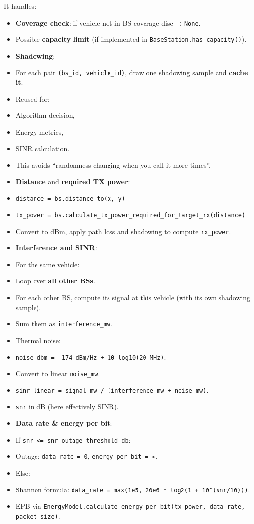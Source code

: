 \documentclass[conference]{IEEEtran}
\begin{document}
It handles:
\begin{itemize}
\item \textbf{Coverage check}: if vehicle not in BS coverage disc → \texttt{None}.
\item Possible \textbf{capacity limit} (if implemented in \texttt{BaseStation.has\_capacity()}).
\item \textbf{Shadowing}:
\item For each pair \texttt{(bs\_id, vehicle\_id)}, draw one shadowing sample and \textbf{cache it}.
\item Reused for:
\item Algorithm decision,
\item Energy metrics,
\item SINR calculation.
\item This avoids “randomness changing when you call it more times”.
\item \textbf{Distance} and \textbf{required TX power}:
\item \texttt{distance = bs.distance\_to(x, y)}
\item \texttt{tx\_power = bs.calculate\_tx\_power\_required\_for\_target\_rx(distance)}
\item Convert to dBm, apply path loss and shadowing to compute \texttt{rx\_power}.
\item \textbf{Interference and SINR}:
\item For the same vehicle:
\item Loop over \textbf{all other BSs}.
\item For each other BS, compute its signal at this vehicle (with its own shadowing sample).
\item Sum them as \texttt{interference\_mw}.
\item Thermal noise:
\item \texttt{noise\_dbm = -174 dBm/Hz + 10 log10(20 MHz)}.
\item Convert to linear \texttt{noise\_mw}.
\item \texttt{sinr\_linear = signal\_mw / (interference\_mw + noise\_mw)}.
\item \texttt{snr} in dB (here effectively SINR).
\item \textbf{Data rate \& energy per bit}:
\item If \texttt{snr <= snr\_outage\_threshold\_db}:
\item Outage: \texttt{data\_rate = 0}, \texttt{energy\_per\_bit = ∞}.
\item Else:
\item Shannon formula: \texttt{data\_rate = max(1e5, 20e6 * log2(1 + 10^(snr/10)))}.
\item EPB via \texttt{EnergyModel.calculate\_energy\_per\_bit(tx\_power, data\_rate, packet\_size)}.
\end{itemize}
\end{document}
